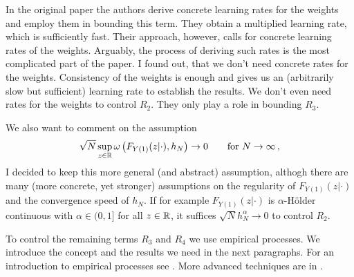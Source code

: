 \begin{remark}
In the original paper \cite{Wang2019} the authors derive concrete learning rates for the weights and employ them in bounding this term. They obtain a multiplied learning rate, which is sufficiently fast. Their approach, however, calls for concrete learning rates of the weights. Arguably, the process of deriving such rates is the most complicated part of the paper. 
I found out, that we don't need concrete rates for the weights. 
Consistency of the weights is enough and gives us an (arbitrarily slow but sufficient) learning rate to establish the results.
We don't even need rates for the weights to control $R_2$.
They only play a role in bounding $R_3$.

We also want to comment on the assumption
\begin{gather*}
  \sqrt{N}
  \sup_{z\in\R}
  \omega
  \left( 
    F_{Y(1)}(z|\cdot)
    ,h_N
  \right)
  \to
  0
  \qquad
  \text{for}\ 
  N\to \infty
  \,,
\end{gather*}
I decided to keep this more general (and abstract) assumption, althogh
there are many (more concrete, yet stronger) assumptions on the regularity of
$
    F_{Y(1)}(z|\cdot)
$
and the convergence speed of $h_N$.
If for example 
$
    F_{Y(1)}(z|\cdot)
$
is $\alpha$-Hölder continuous with $\alpha\in(0,1]$ for all $z\in\mathbb{R}$, it suffices $\sqrt{N}h_N^\alpha\to0$ to control $R_2$.
\end{remark}

To control the remaining terms $R_3$ and $R_4$ we use empirical processes. We introduce the concept and the results we need in the next paragraphs. 
For an introduction to empirical processes see \cite{Vaart2000}. More advanced techniques are in \cite{vaart2013}.

